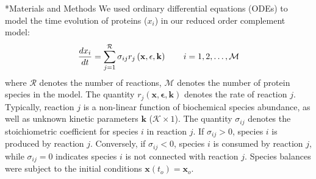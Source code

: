 \documentclass[12pt]{article}
\makeatletter
\renewcommand\section{\@startsection
	{subsection}{2}{0mm}
	{-0.2in}
	{0.05\baselineskip}
	{\normalfont\large\bfseries}}
\makeatother
\begin{document}
%
%
%
%
%
%
%



\clearpage

\section*{Materials and Methods}
We used ordinary differential equations (ODEs) to model the time evolution of proteins ($x_{i}$) in our reduced order complement model:
\begin{equation}
	\frac{dx_{i}}{dt}  =  \sum_{j = 1}^{\mathcal{R}}\sigma_{ij}r_{j}\left(\mathbf{x},\mathbf{\epsilon},\mathbf{k}\right)\qquad{i=1,2,\hdots,\mathcal{M}}\\
\end{equation}
where $\mathcal{R}$ denotes the number of reactions, $\mathcal{M}$ denotes the number of protein species in the model.
The quantity $r_{j}\left(\mathbf{x},\mathbf{\epsilon},\mathbf{k}\right)$ denotes the rate of reaction $j$.
Typically, reaction $j$ is a non-linear function of biochemical species abundance, as well as unknown kinetic parameters $\mathbf{k}$ ($\mathcal{K}\times{1}$).
The quantity $\sigma_{ij}$ denotes the stoichiometric coefficient for species $i$ in reaction $j$.
If $\sigma_{ij}>0$, species $i$ is produced by reaction $j$.
Conversely, if $\sigma_{ij}<0$, species $i$ is consumed by reaction $j$, while $\sigma_{ij} = 0$ indicates species $i$ is not connected with reaction $j$.
Species balances were subject to the initial conditions $\mathbf{x}\left(t_{o}\right) = \mathbf{x}_{o}$.
\end{document}
